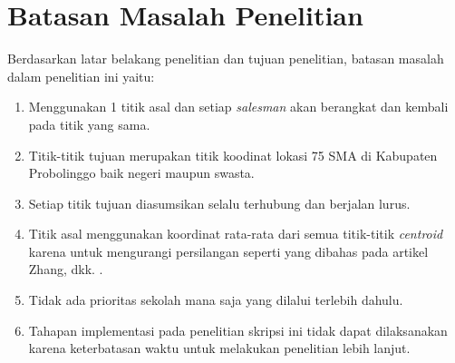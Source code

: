 \section{Batasan Masalah Penelitian}

Berdasarkan latar belakang penelitian dan tujuan penelitian, batasan masalah dalam penelitian ini yaitu:

\begin{enumerate}
	\item Menggunakan 1 titik asal dan setiap \textit{salesman} akan berangkat dan kembali pada titik yang sama.
	\item Titik-titik tujuan merupakan titik koodinat lokasi 75 SMA di Kabupaten Probolinggo baik negeri maupun swasta.
	\item Setiap titik tujuan diasumsikan selalu terhubung dan berjalan lurus.
	\item Titik asal menggunakan koordinat rata-rata dari semua titik-titik \textit{centroid} karena untuk mengurangi persilangan seperti yang dibahas pada artikel Zhang, dkk. \cite{inproceedings}.
	\item Tidak ada prioritas sekolah mana saja yang dilalui terlebih dahulu.
	\item Tahapan implementasi pada penelitian skripsi ini tidak dapat dilaksanakan karena keterbatasan waktu untuk melakukan penelitian lebih lanjut.
\end{enumerate}